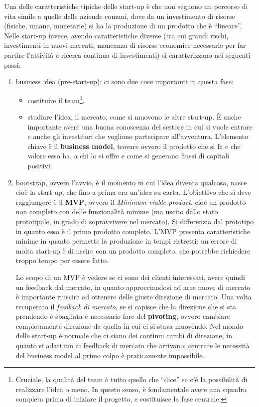 \noindent Una delle caratteristiche tipiche delle start-up è che non seguono un
percorso di vita simile a quelle delle aziende comuni, dove da un investimento
di risorse (fisiche, umane, monetarie) si ha la produzione di un prodotto che è
``lineare''.
Nelle start-up invece, avendo caratteristiche diverse (tra cui grandi rischi,
investimenti in nuovi mercati, mancanza di risorse economice necessarie per
far partire l'attività e ricerca continua di investimenti) si caratterizzano
nei seguenti passi:
\begin{enumerate}
 \item business idea (pre-start-up): ci sono due cose importanti in questa fase:
 \begin{itemize}
  \item costituire il team\footnote{Cruciale, la qualità del team è tutto
quello che ``dice'' se c'è la possibilità di realizzare l'idea o meno. In
questo senso, è fondamentale avere una squadra completa prima di iniziare il
progetto, e costituisce la fase centrale.}.
  \item studiare l'idea, il mercato, come si muovono le altre start-up. È anche
importante avere una buona conoscenza del settore in cui si vuole entrare e
anche gli investitori che vogliono partecipare all'avventura. L'elemento chiave
è il \textbf{business model}, trovare ovvero il prodotto che si fa e che valore
esso ha, a chi lo si offre e come si generano flussi di capitali positivi.
 \end{itemize}
 \item bootstrap, ovvero l'avvio, è il momento in cui l'idea diventa qualcosa,
nasce cioè la start-up, che fino a prima era un'idea su carta. L'obiettivo che
si deve raggiungere è il \textbf{MVP}, ovvero il \textit{Minimum viable
product}, cioè un prodotto non completo con delle funzionalità minime (ma
uscito dallo stato prototipale, in grado di sopravvivere nel mercato). Si
differenzia dal prototipo in quanto esso è il primo prodotto completo. L'MVP
presenta caratteristiche minime in quanto permette la produzione in tempi
ristretti: un errore di molta start-up è di uscire con un prodotto completo,
che potrebbe richiedere troppo tempo per essere fatto.

Lo scopo di un MVP è vedere se ci sono dei clienti interessati, avere quindi un
feedback dal mercato, in quanto approcciandosi ad aree nuove di mercato è
importante riuscire ad ottenere delle giuste direzione di mercato. Una volta
recuperato il \textit{feedback di mercato}, se si capisce che la direzione che
si sta prendendo è sbagliata è necessario fare del \textbf{pivoting}, ovvero
cambiare completamente direzione da quella in cui ci si stava muovendo. Nel
mondo delle start-up è normale che ci siano dei continui cambi di direzione, in
quanto si adattano ai feedback di mercato che arrivano: centrare le necessità
del business model al primo colpo è praticamente impossibile.


\end{enumerate}

